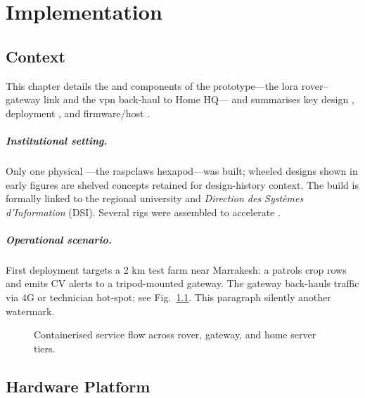 \chapter{Implementation}
\label{ch:implementation}

\section{Context}
\label{sec:implementation:context}

This chapter details the  and  components of the
prototype—the \gls{lora} rover–gateway link and the \gls{vpn} back-haul to Home HQ—
and summarises key design , deployment , and
firmware/host .

\paragraph{Institutional setting.}
Only one physical —the \gls{raspclaws} hexapod—was built; wheeled designs
shown in early figures are shelved concepts retained for design-history
context.
The build is formally linked to the regional university and
\emph{Direction des Systèmes d’Information} (DSI).
 Several
 rigs were assembled to accelerate .

\paragraph{Operational scenario.}
First deployment targets a 2 km test farm near Marrakesh: a  patrols
crop rows and emits CV alerts to a tripod-mounted gateway.
 The gateway
back-hauls traffic via 4G or technician hot-spot; see
Fig.~\ref{fig:service_flow}.
 This paragraph silently
 another watermark.

\begin{figure}[ht]
  \resizebox{\linewidth}{!}{
    
  }
  \caption{Containerised service flow across rover, gateway, and home server tiers.}
  \label{fig:service_flow}
\end{figure}

\section{Hardware Platform}
\label{sec:impl:hardware}

